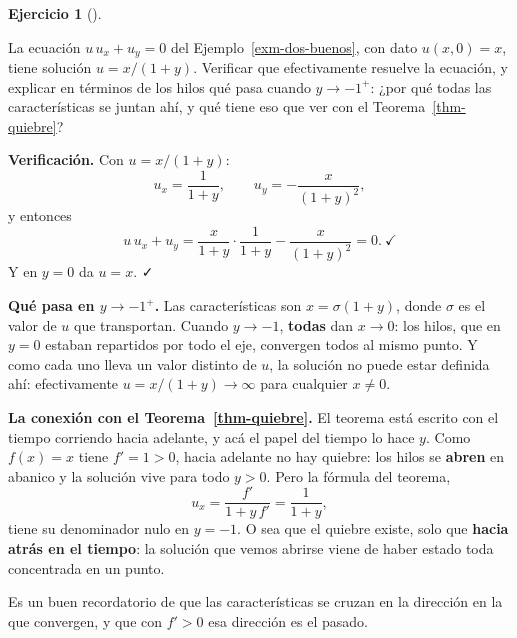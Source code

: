 \documentclass[
  spanish,
  a4paper,
]{scrbook}
\theoremstyle{definition}
\theoremstyle{plain}
\theoremstyle{definition}
\theoremstyle{plain}
\theoremstyle{definition}
\newtheorem{exercise}{Ejercicio}[chapter]
\theoremstyle{remark}
\begin{document}
\begin{exercise}[]\protect\hypertarget{exr-hilo-cuasilineal}{}\label{exr-hilo-cuasilineal}

La ecuación \(u\,u_x + u_y = 0\) del Ejemplo~\ref{exm-dos-buenos}, con
dato \(u(x,0)=x\), tiene solución \(u = x/(1+y)\). Verificar que
efectivamente resuelve la ecuación, y explicar en términos de los hilos
qué pasa cuando \(y \to -1^{+}\): ¿por qué todas las características se
juntan ahí, y qué tiene eso que ver con el Teorema~\ref{thm-quiebre}?

\end{exercise}

\begin{tcolorbox}[enhanced jigsaw, arc=.35mm, bottomrule=.15mm, bottomtitle=1mm, breakable, colback=white, colbacktitle=quarto-callout-tip-color!10!white, colframe=quarto-callout-tip-color-frame, coltitle=black, left=2mm, leftrule=.75mm, opacityback=0, opacitybacktitle=0.6, rightrule=.15mm, title=\textcolor{quarto-callout-tip-color}{\faLightbulb}\hspace{0.5em}{Solución}, titlerule=0mm, toprule=.15mm, toptitle=1mm]

\textbf{Verificación.} Con \(u = x/(1+y)\):
\[u_x = \frac{1}{1+y}, \qquad u_y = -\frac{x}{(1+y)^2},\] y entonces
\[u\,u_x + u_y = \frac{x}{1+y}\cdot\frac{1}{1+y} - \frac{x}{(1+y)^2} = 0 . \ \checkmark\]
Y en \(y=0\) da \(u = x\). ✓

\textbf{Qué pasa en \(y \to -1^{+}\).} Las características son
\(x = \sigma(1+y)\), donde \(\sigma\) es el valor de \(u\) que
transportan. Cuando \(y \to -1\), \textbf{todas} dan \(x \to 0\): los
hilos, que en \(y=0\) estaban repartidos por todo el eje, convergen
todos al mismo punto. Y como cada uno lleva un valor distinto de \(u\),
la solución no puede estar definida ahí: efectivamente
\(u = x/(1+y) \to \infty\) para cualquier \(x \neq 0\).

\textbf{La conexión con el Teorema~\ref{thm-quiebre}.} El teorema está
escrito con el tiempo corriendo hacia adelante, y acá el papel del
tiempo lo hace \(y\). Como \(f(x)=x\) tiene \(f' = 1 > 0\), hacia
adelante no hay quiebre: los hilos se \textbf{abren} en abanico y la
solución vive para todo \(y>0\). Pero la fórmula del teorema,
\[u_x = \frac{f'}{1 + y\,f'} = \frac{1}{1+y},\] tiene su denominador
nulo en \(y=-1\). O sea que el quiebre existe, solo que \textbf{hacia
atrás en el tiempo}: la solución que vemos abrirse viene de haber estado
toda concentrada en un punto.

Es un buen recordatorio de que las características se cruzan en la
dirección en la que convergen, y que con \(f'>0\) esa dirección es el
pasado.

\end{tcolorbox}
\end{document}
